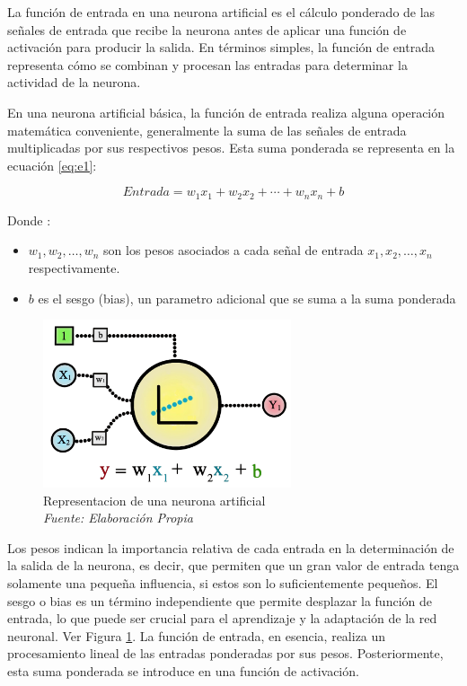 La función de entrada en una neurona artificial es el cálculo ponderado de las señales de entrada que recibe la neurona antes de aplicar una función de activación para producir la salida. En términos simples, la función de entrada representa cómo se combinan y procesan las entradas para determinar la actividad de la neurona.

En una neurona artificial básica, la función de entrada realiza alguna operación matemática conveniente, generalmente la suma de las señales de entrada multiplicadas por sus respectivos pesos. Esta suma ponderada se representa en la ecuación \ref{eq:e1}:

\begin{equation} \label{eq:e1} 
	Entrada = w_1x_1 + w_2x_2 + \cdots + w_nx_n + b 
\end{equation}

Donde : 
\begin{itemize}
\item $w_1, w_2, \ldots, w_n$ son los pesos asociados a cada señal de entrada $x_1, x_2, \ldots, x_n$ respectivamente.
\item $b$ es el sesgo (bias), un parametro adicional que se suma a la suma ponderada
\end{itemize}

\begin{figure}
	\includegraphics[width=0.65\textwidth]{capitulo2/figuras/an6.png}
	\caption{Representacion de una neurona artificial \\\textit{ Fuente: Elaboración Propia} }
	\label{fig:an6}
\end{figure}

Los pesos indican la importancia relativa de cada entrada en la determinación de la salida de la neurona, es decir, que permiten que un gran valor de entrada tenga solamente una pequeña influencia, si estos son lo suficientemente pequeños. El sesgo o bias es un término independiente que permite desplazar la función de entrada, lo que puede ser crucial para el aprendizaje y la adaptación de la red neuronal. Ver Figura \ref{fig:an6}. La función de entrada, en esencia, realiza un procesamiento lineal de las entradas ponderadas por sus pesos. Posteriormente, esta suma ponderada se introduce en una función de activación.

